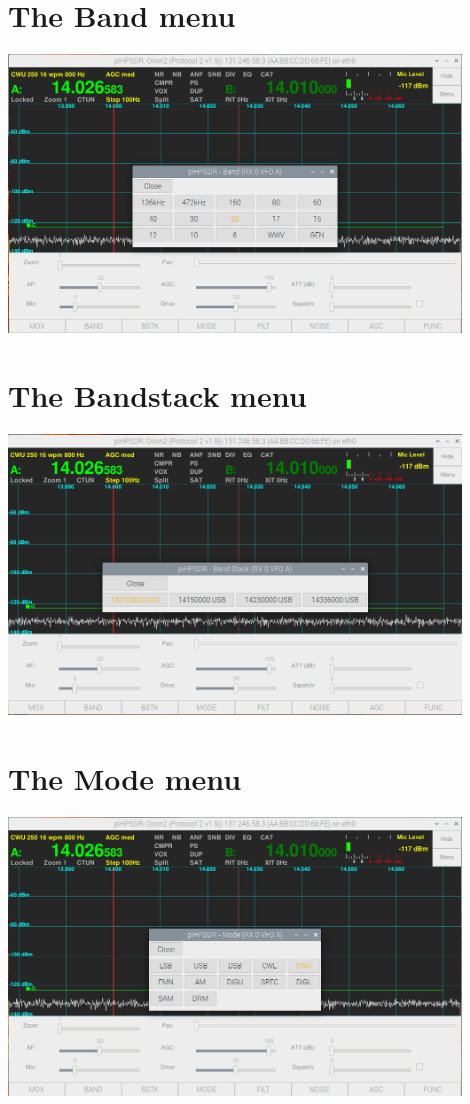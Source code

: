 \documentclass[12pt]{book}
\begin{document}
\section{The Band menu}
\begin{center}
\includegraphics[width=12cm]{BandMenu.png}
\end{center}

\section{The Bandstack menu}
\begin{center}
\includegraphics[width=12cm]{BandstackMenu.png}
\end{center}

\section{The Mode menu}
\begin{center}
\includegraphics[width=12cm]{ModeMenu.png}
\end{center}
\end{document}
